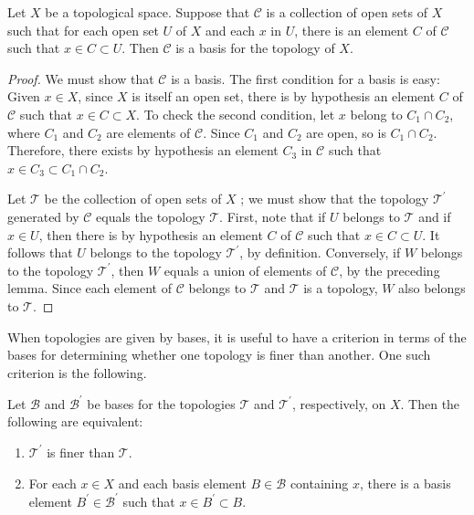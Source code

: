 \begin{lemma}
\label{lem:\thetheorem}
 Let \(X\) be a topological space. Suppose that \(\mathcal{C}\) is a collection of open sets of \(X\) such that for each open set \(U\) of \(X\) and each \(x\) in \(U\), there is an element \(C\) of \(\mathcal{C}\) such that \(x \in C \subset U\). Then \(\mathcal{C}\) is a basis for the topology of \(X\).
\end{lemma}

\begin{proof}
 We must show that \(\mathcal{C}\) is a basis. The first condition for a basis is easy: Given \(x \in X\), since \(X\) is itself an open set, there is by hypothesis an element \(C\) of \(\mathcal{C}\) such that \(x \in C \subset X\). To check the second condition, let \(x\) belong to \(C_{1} \cap {C}_{2}\), where \(C_{1}\) and \(C_{2}\) are elements of \(\mathcal{C}\). Since \(C_{1}\) and \(C_{2}\) are open, so is \(C_{1} \cap {C}_{2}\). Therefore, there exists by hypothesis an element \(C_{3}\) in \(\mathcal{C}\) such that \(x \in {C}_{3} \subset {C}_{1} \cap {C}_{2}\).

 Let \(\mathcal{T}\) be the collection of open sets of \(X\) ; we must show that the topology \(\mathcal{T}^{\prime }\) generated by \(\mathcal{C}\) equals the topology \(\mathcal{T}\). First, note that if \(U\) belongs to \(\mathcal{T}\) and if \(x \in U\), then there is by hypothesis an element \(C\) of \(\mathcal{C}\) such that \(x \in C \subset U\). It follows that \(U\) belongs to the topology \(\mathcal{T}^{\prime }\), by definition. Conversely, if \(W\) belongs to the topology \(\mathcal{T}^{\prime }\), then \(W\) equals a union of elements of \(\mathcal{C}\), by the preceding lemma. Since each element of \(\mathcal{C}\) belongs to \(\mathcal{T}\) and \(\mathcal{T}\) is a topology, \(W\) also belongs to \(\mathcal{T}\).
\end{proof}

When topologies are given by bases, it is useful to have a criterion in terms of the bases for determining whether one topology is finer than another. One such criterion is the following.

\begin{lemma}
\label{lem:\thetheorem}
 Let \(\mathcal{B}\) and \(\mathcal{B}^{\prime }\) be bases for the topologies \(\mathcal{T}\) and \(\mathcal{T}^{\prime }\), respectively, on \(X\). Then the following are equivalent:

 \begin{enumerate}[itemsep=0.2em, parsep=0pt, topsep=0pt, partopsep=0pt, leftmargin=*, label=(\arabic*), align=left]
 \item \(\mathcal{T}^{\prime }\) is finer than \(\mathcal{T}\).
 \item For each \(x \in X\) and each basis element \(B \in \mathcal{B}\) containing \(x\), there is a basis element \(B^{\prime } \in {\mathcal{B}}^{\prime }\) such that \(x \in {B}^{\prime } \subset B\).
 \end{enumerate}
\end{lemma}

